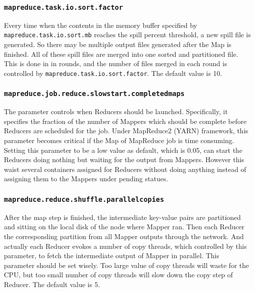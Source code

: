 \subsubsection{\texttt{mapreduce.task.io.sort.factor}}

Every time when the contents in the memory buffer specified by \\
\texttt{mapreduce.task.io.sort.mb} reaches the spill percent threshold, a new
spill file is generated. So there may be multiple output files generated after 
the Map is finished. All of these spill files are merged into one sorted and
partitioned file. This is done in in rounds, and the number of files merged in 
each round is controlled by \texttt{mapreduce.task.io.sort.factor}. The default 
value is 10.

\subsubsection{\texttt{mapreduce.job.reduce.slowstart.completedmaps}}

The parameter controls when Reducers should be launched. Specifically, it specifies
the fraction of the number of Mappers which should be complete before Reducers
are scheduled for the job. Under MapReduce2 (YARN) \cite{YARN} framework, this parameter
becomes critical if the Map of MapReduce job is time consuming. Setting this 
parameter to be a low value as default, which is 0.05, can start the Reducers
doing nothing but waiting for the output from Mappers. However this waist several
containers assigned for Reducers without doing anything instead of assigning them
to the Mappers under pending statues.   

\subsubsection{\texttt{mapreduce.reduce.shuffle.parallelcopies}}

After the map step is finished, the intermediate key-value pairs are partitioned
and sitting on the local disk of the node where Mapper ran. Then each Reducer 
the corresponding partition from all Mapper outputs through the network. And
actually each Reducer evokes a number of copy threads, which controlled by this
parameter, to fetch the intermediate output of Mapper in parallel. This parameter
should be set wisely. Too large value of copy threads will waste for the CPU,
but too small number of copy threads will slow down the copy step of Reducer.
The default value is 5.


